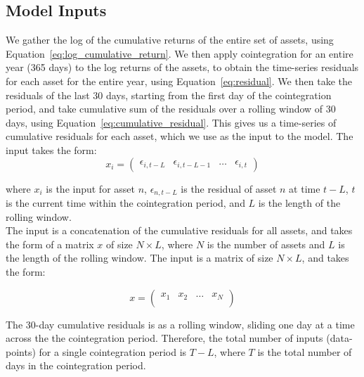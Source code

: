 \documentclass[12pt]{article}
\begin{document}
\subsection*{Model Inputs}

We gather the log of the cumulative returns of the entire set of assets, using Equation~\ref{eq:log_cumulative_return}. We then apply cointegration for an entire year (365 days) to the log returns of the assets, to obtain the time-series residuals for each asset for the entire year, using Equation~\ref{eq:residual}. We then take the residuals of the last 30 days, starting from the first day of the cointegration period, and take cumulative sum of the residuals over a rolling window of 30 days, using Equation~\ref{eq:cumulative_residual}. This gives us a time-series of cumulative residuals for each asset, which we use as the input to the model. The input takes the form:
\begin{equation}
    x_i = \begin{pmatrix}
        \epsilon_{i,t-L} & \epsilon_{i,t-L-1} & \ldots & \epsilon_{i,t}
    \end{pmatrix}
    \label{eq:input_single_asset}
\end{equation}

where $x_i$ is the input for asset $n$, $\epsilon_{n,t-L}$ is the residual of asset $n$ at time $t-L$, $t$ is the current time within the cointegration period, and $L$ is the length of the rolling window. 
\\
The input is a concatenation of the cumulative residuals for all assets, and takes the form of a matrix $x$ of size $N \times L$, where $N$ is the number of assets and $L$ is the length of the rolling window. The input is a matrix of size $N \times L$, and takes the form:

\begin{equation}
    x = \begin{pmatrix}
        x_1 & x_2 & \ldots & x_N \\
    \end{pmatrix}
    \label{eq:input_matrix}
\end{equation}

The 30-day cumulative residuals is as a rolling window, sliding one day at a time across the the cointegration period. Therefore, the total number of inputs (data-points) for a single cointegration period is $T - L$, where $T$ is the total number of days in the cointegration period.

\end{document}
